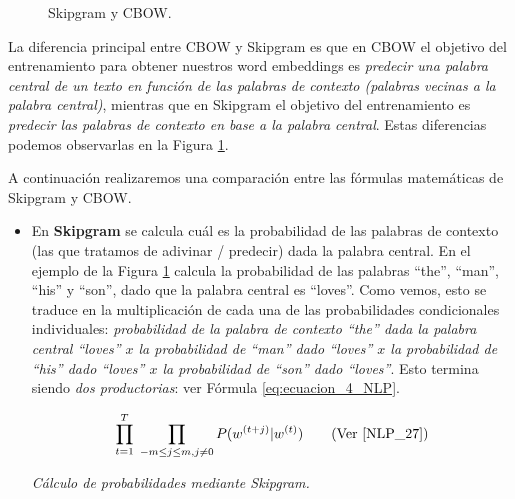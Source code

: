 \documentclass[12pt,a4paper]{article}
\begin{document}
\begin{sloppypar}
\begin{figure}[H]    %
 \centering
 \noindent{}
 \caption{Skipgram y CBOW\cite{NLP_27}.}
 \label{fig:Imagen_NLP_15}
\end{figure}

\cleardoublepage

La diferencia principal entre CBOW y Skipgram es que en CBOW el objetivo del entrenamiento para obtener nuestros word embeddings es \textit{predecir una palabra central de un texto en función de las palabras de contexto (palabras vecinas a la palabra central)}, mientras que en Skipgram el objetivo del entrenamiento es \textit{predecir las palabras de contexto en base a la palabra central}. Estas diferencias podemos observarlas en la Figura \ref{fig:Imagen_NLP_15}.

A continuación realizaremos una comparación entre las fórmulas matemáticas de Skipgram y CBOW. 
\begin{itemize}

\item En \textbf{Skipgram} se calcula cuál es la probabilidad de las palabras de contexto (las que tratamos de adivinar / predecir) dada la palabra central. En el ejemplo de la  Figura \ref{fig:Imagen_NLP_15} calcula la probabilidad de las palabras “the”, “man”, “his” y “son”, dado que la palabra central es “loves”. Como vemos, esto se traduce en la multiplicación de cada una de las probabilidades condicionales individuales: \textit{probabilidad de la palabra de contexto “the” dada la palabra central “loves” $x$ la probabilidad de “man” dado “loves” $x$ la probabilidad de “his” dado “loves” $x$ la probabilidad de “son” dado “loves”}. Esto termina siendo \textit{dos productorias}: ver Fórmula \ref{eq:ecuacion_4_NLP}. 

\begin{equation}\label{eq:ecuacion_4_NLP}
\prod_{t=1}^{T} \; \prod_{-m \leq j \leq m, j \neq 0}  P(w^{(t+j)} | w^{(t)}) \qquad \text{(Ver \cite{NLP_27})}
\end{equation}
\begin{center}
\textit{Cálculo de probabilidades mediante Skipgram.}
\end{center}


\end{itemize}
\end{sloppypar}
\end{document}
